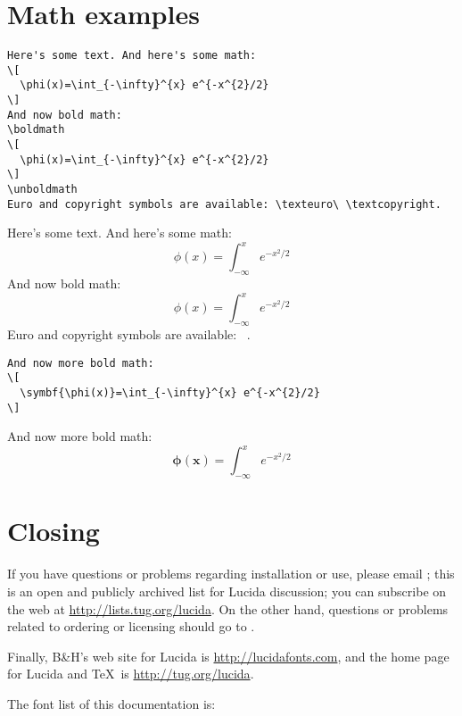 \documentclass[11pt]{article}
\begin{document}
\section{Math examples}

\begin{verbatim}
Here's some text. And here's some math:
\[ 
  \phi(x)=\int_{-\infty}^{x} e^{-x^{2}/2} 
\]
And now bold math:
\boldmath
\[ 
  \phi(x)=\int_{-\infty}^{x} e^{-x^{2}/2} 
\]
\unboldmath
Euro and copyright symbols are available: \texteuro\ \textcopyright.
\end{verbatim}

Here's some text. And here's some math:
\[ 
  \phi(x)=\int_{-\infty}^{x} e^{-x^{2}/2} 
\]
And now bold math:
\boldmath
\[ 
  \phi(x)=\int_{-\infty}^{x} e^{-x^{2}/2} 
\]
\unboldmath
Euro and copyright symbols are available: \texteuro\ \textcopyright.


\begin{verbatim}
And now more bold math:
\[ 
  \symbf{\phi(x)}=\int_{-\infty}^{x} e^{-x^{2}/2} 
\]
\end{verbatim}

And now more bold math:
\[ 
  \symbf{\phi(x)}=\int_{-\infty}^{x} e^{-x^{2}/2} 
\]

\section{Closing}

If you have questions or problems regarding installation or use, please
email ; this is an open and publicly archived list
for Lucida discussion; you can subscribe on the web at
\url{http://lists.tug.org/lucida}.  On the other hand, questions or
problems related to ordering or licensing should go to
.

Finally, B\&H's web site for Lucida is \url{http://lucidafonts.com},
and the home page for Lucida and \TeX\ is \url{http://tug.org/lucida}.

The font list of this documentation is:

\footnotesize\ttfamily
\expandafter\IfFileExists\expandafter{\jobname.txt}%
  {}{}

\normalfont\rmfamily

\nocite{*}
\printbibliography
\end{document}
